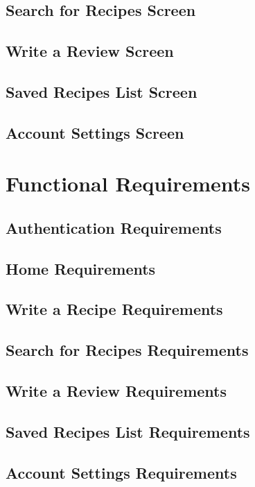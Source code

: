 \subsection{Search for Recipes Screen}

\subsection{Write a Review Screen}

\subsection{Saved Recipes List Screen}

\subsection{Account Settings Screen}

\section{Functional Requirements}
\subsection{Authentication Requirements}

\subsection{Home Requirements}

\subsection{Write a Recipe Requirements}

\subsection{Search for Recipes Requirements}

\subsection{Write a Review Requirements}

\subsection{Saved Recipes List Requirements}

\subsection{Account Settings Requirements}

